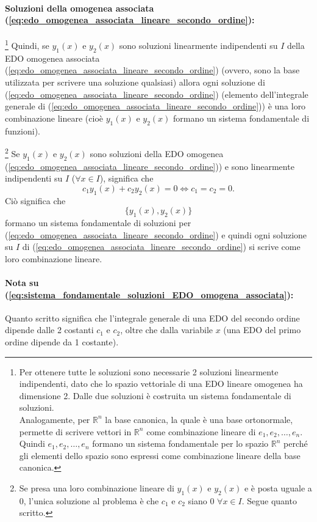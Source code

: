 \paragraph{Soluzioni della omogenea associata (\ref{eq:edo_omogenea_associata_lineare_secondo_ordine}): }\footnote{Per ottenere tutte le soluzioni sono necessarie 2 soluzioni linearmente indipendenti, dato che lo spazio vettoriale di una EDO lineare omogenea ha dimensione 2. Dalle due soluzioni è costruita un sistema fondamentale di soluzioni.\\
Analogamente, per $\mathbb R^n$ la base canonica, la quale è una \gls{base ortonormale}, permette di scrivere vettori in $\mathbb R^n$ come combinazione lineare di $e_1,e_2,\hdots, e_n$. Quindi $e_1,e_2,\hdots, e_n$ formano un sistema fondamentale per lo spazio $\mathbb R^n$ perché gli elementi dello spazio sono espressi come combinazione lineare della base canonica.} Quindi, se $y_1(x)$ e $y_2(x)$ sono soluzioni linearmente indipendenti su $I$ della EDO omogenea associata (\ref{eq:edo_omogenea_associata_lineare_secondo_ordine}) (ovvero, sono la base utilizzata per scrivere una soluzione qualsiasi) allora ogni soluzione di (\ref{eq:edo_omogenea_associata_lineare_secondo_ordine}) (elemento dell'integrale generale di (\ref{eq:edo_omogenea_associata_lineare_secondo_ordine})) è una loro combinazione lineare (cioè $y_1(x)$ e $y_2(x)$ formano un sistema fondamentale di funzioni).

\footnote{Se presa una loro combinazione lineare di $y_1(x)$ e $y_2(x)$ e è posta uguale a 0, l'unica soluzione al problema è che $c_1$ e $c_2$ siano 0 $\forall x\in I$. Segue quanto scritto.} Se $y_1(x)$ e $y_2(x)$ sono soluzioni della EDO omogenea (\ref{eq:edo_omogenea_associata_lineare_secondo_ordine})) e sono linearmente indipendenti su $I$ ($\forall x\in I$), significa che
\begin{equation*}
    c_1 y_1(x) + c_2 y_2(x) = 0 \iff c_1=c_2=0.
\end{equation*}
Ciò significa che
\begin{equation}\label{eq:sistema_fondamentale_soluzioni_EDO_omogena_associata}
    \{y_1(x), y_2(x)\}
\end{equation}
formano un sistema fondamentale di soluzioni per (\ref{eq:edo_omogenea_associata_lineare_secondo_ordine}) e quindi ogni soluzione su $I$ di (\ref{eq:edo_omogenea_associata_lineare_secondo_ordine}) si scrive come loro combinazione lineare.

\paragraph{Nota su (\ref{eq:sistema_fondamentale_soluzioni_EDO_omogena_associata}):} Quanto scritto significa che l'integrale generale di una EDO del secondo ordine dipende dalle 2 costanti $c_1$ e $c_2$, oltre che dalla variabile $x$ (una EDO del primo ordine dipende da 1 costante).

